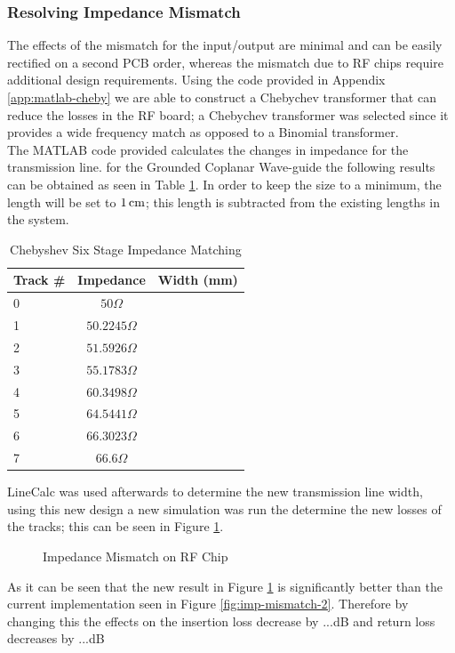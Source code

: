 \documentclass[12pt,openany,a4paper]{book}
\newcommand{\cm}	{\ensuremath{\rm\,cm}}
\begin{document}
\subsubsection{Resolving Impedance Mismatch}
The effects of the mismatch for the input/output are minimal and can be easily rectified on a second PCB order, whereas the mismatch due to RF chips require additional design requirements. Using the code provided in Appendix \ref{app:matlab-cheby} we are able to construct a Chebychev transformer that can reduce the losses in the RF board; a Chebychev transformer was selected since it provides a wide frequency match as opposed to a Binomial transformer. \\[0.2cm]
The MATLAB code provided calculates the changes in impedance for the transmission line. for the Grounded Coplanar Wave-guide the following results can be obtained as seen in Table \ref{tab:cheby-6imp}. In order to keep the size to a minimum, the length will be set to $1\cm$; this length is subtracted from the existing lengths in the system.
\begin{table}[H]
\centering
\begin{tabular}{l c c}
	\hline
	Track \# & Impedance & Width (mm) \\
	\hline
	0 & $50\Omega$ 		& \\
	1 & $50.2245\Omega$ & \\
	2 & $51.5926\Omega$ & \\
	3 & $55.1783\Omega$ & \\
	4 & $60.3498\Omega$ & \\
	5 & $64.5441\Omega$ & \\
	6 & $66.3023\Omega$ & \\
	7 & $66.6\Omega$ 	& \\	
	\hline
\end{tabular} 
\caption{Chebyshev Six Stage Impedance Matching}
\label{tab:cheby-6imp}
\end{table}
LineCalc was used afterwards to determine the new transmission line width, using this new design a new simulation was run the determine the new losses of the tracks; this can be seen in Figure \ref{fig:imp-mismatch-3}.
\begin{figure}[H]
	\centering
	\caption{Impedance Mismatch on RF Chip}
	\label{fig:imp-mismatch-3}
\end{figure} 
As it can be seen that the new result in Figure \ref{fig:imp-mismatch-3} is significantly better than the current implementation seen in Figure \ref{fig:imp-mismatch-2}. Therefore by changing this the effects on the insertion loss decrease by $...$dB and return loss decreases by $...$dB
\end{document}
